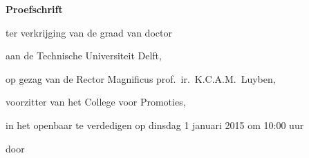 \begin{titlepage}

\begin{center}

\vspace*{2\bigskipamount}

{\makeatletter
\titlestyle\bfseries\LARGE\@title
\makeatother}

{\makeatletter
\ifx\@subtitle\undefined\else
    \bigskip
    \titlefont\titleshape\Large\@subtitle
\fi
\makeatother}

\end{center}

\cleardoublepage
\thispagestyle{empty}

\begin{center}


\vspace*{2\bigskipamount}

{\makeatletter
\titlestyle\bfseries\LARGE\@title
\makeatother}

{\makeatletter
\ifx\@subtitle\undefined\else
    \bigskip
    \titlefont\titleshape\Large\@subtitle
\fi
\makeatother}

\vfill


{\Large\titlefont\bfseries Proefschrift}

\bigskip
\bigskip

ter verkrijging van de graad van doctor

aan de Technische Universiteit Delft,

op gezag van de Rector Magnificus prof.~ir.~K.C.A.M.~Luyben,

voorzitter van het College voor Promoties,

in het openbaar te verdedigen op dinsdag 1 januari 2015 om 10:00 uur

\bigskip
\bigskip

door

\bigskip
\bigskip

\makeatletter
{\Large\titlefont\bfseries\@firstname\ {\titleshape\@lastname}}
\makeatother


\end{center}
\end{titlepage}
